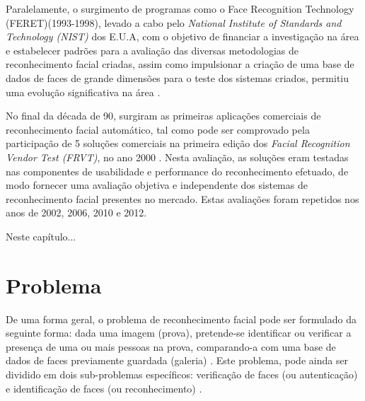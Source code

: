 Paralelamente, o surgimento de programas como o Face Recognition Technology (FERET)(1993-1998), levado a cabo pelo \textit{National Institute of Standards and Technology (NIST)} dos E.U.A, com o objetivo de financiar a investigação na área e estabelecer padrões para a avaliação das diversas metodologias de reconhecimento facial criadas, assim como impulsionar a criação de uma base de dados de faces de grande dimensões para o teste dos sistemas criados, permitiu uma evolução significativa na área \citep{Phillips1998, Phillips2000}.

No final da década de 90, surgiram as primeiras aplicações comerciais de reconhecimento facial automático, tal como pode ser comprovado  pela participação de 5 soluções comerciais na primeira edição dos \textit{Facial Recognition Vendor Test (FRVT)}, no ano 2000 \citep{BlackburnDuaneM.;BoneMike;Phillips2001}. Nesta avaliação, as soluções eram testadas nas componentes de usabilidade e performance do reconhecimento efetuado, de modo fornecer uma avaliação objetiva e independente dos sistemas de reconhecimento facial presentes no mercado. Estas avaliações foram repetidos nos anos de 2002, 2006, 2010 e 2012.

Neste capítulo...

\section{Problema} \label{problema}
De uma forma geral, o problema de reconhecimento facial pode ser formulado da seguinte forma: dada uma imagem (prova), pretende-se identificar ou verificar a presença de uma ou mais pessoas na prova, comparando-a com uma base de dados de faces previamente guardada (galeria) \citep{Yang2002, Zhao2003}. Este problema, pode ainda ser dividido em dois sub-problemas específicos: verificação de faces (ou autenticação) e identificação de faces (ou reconhecimento) \citep{Li2011}.

